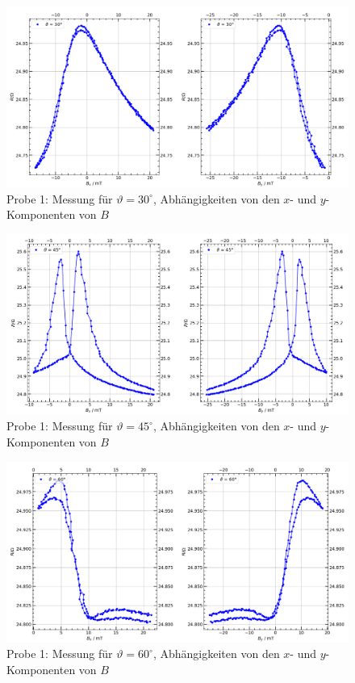 \documentclass[german,  %
parskip=full,  %
]{scrartcl}
\begin{document}
\newpage
\begin{figure}[h!]\centering
\includegraphics[width=\textwidth]{Probe1_30_Grad.png}
\caption{Probe 1: Messung für \(\vartheta=30^{\circ}\), Abhängigkeiten von den \(x\)- und \(y\)-Komponenten von \(B\)}
\end{figure} 
\begin{figure}[h!]\centering
\includegraphics[width=\textwidth]{Probe1_45_Grad.png}
\caption{Probe 1: Messung für \(\vartheta=45^{\circ}\), Abhängigkeiten von den \(x\)- und \(y\)-Komponenten von \(B\)}
\end{figure} 
\newpage
\begin{figure}[h!]\centering
\includegraphics[width=\textwidth]{Probe1_60_Grad.png}
\caption{Probe 1: Messung für \(\vartheta=60^{\circ}\), Abhängigkeiten von den \(x\)- und \(y\)-Komponenten von \(B\)}
\end{figure} 
\end{document}
